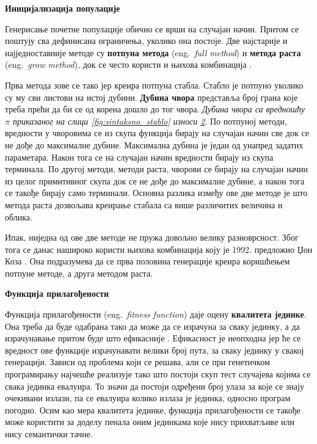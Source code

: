 \documentclass[a4paper]{article}
\begin{document}
\medskip
\noindent
\textbf{\large Иницијализација популације}\newline

Генерисање почетне популације обично се врши на случајан начин. Притом се поштују сва дефинисана ограничења, уколико она постоје. Две најстарије и најједноставније методе су \textbf{потпуна метода} (eng.~{\em full method}) и \textbf{метода раста} (eng.~{\em grow method}), док се често користи и њихова комбинација \cite{fieldGuidetoGP}.

Прва метода зове се тако јер креира потпуна стабла. Стабло је потпуно уколико су му сви листови на истој дубини. \textbf{Дубина чвора} представља број грана које треба прећи да би се од корена дошло до тог чвора. \emph{Дубина чвора са вредношћу $\pi$ приказаног на слици \ref{fig:sintaksno_stablo} износи \underline{2}}. По потпуној методи, вредности у чворовима се из скупа функција бирају на случајан начин све док се не дође до максималне дубине. Максимална дубина је један од унапред задатих параметара. Након тога се на случајан начин вредности бирају из скупа терминала. По другој методи, методи раста, чворови се бирају на случајан начин из целог примитивног скупа док се не дође до максималне дубине, а након тога се такође бирају само терминали. Основна разлика између ове две методе је што метода раста дозвољава креирање стабала са више различитих величина и облика.

Ипак, ниједна од ове две методе не пружа довољно велику разноврсност. Због тога се данас нашироко користи њихова комбинација коју је 1992. предложио Џон Коза \cite{koza}. Она подразумева да се прва половина генерације креира коришћењем потпуне методе, а друга методом раста.\newline

\medskip
\noindent
\textbf{\large Функција прилагођености}\newline 

Функција прилагођености (eng.~{\em fitness function}) даје оцену \textbf{квалитета јединке}. Она треба да буде одабрана тако да може да се израчуна за сваку јединку, а да израчунавање притом буде што ефикасније \cite{vi}. Ефикасност је неопходна јер ће се вредност ове функције израчунавати велики број пута, за сваку јединку у свакој генерацији. Зависи од проблема који се решава, али се при генетичком програмирању најчешће реализује тако што постоји скуп тест случајева којима се свака јединка евалуира. То значи да постоји одређени број улаза за које се знају очекивани излази, па се евалуира колико излаза је јединка, односно програм погодио.
Осим као мера квалитета јединке, функција прилагођености се такође може користити за доделу пенала оним јединкама које нису прихватљиве или нису семантички тачне.\newline
\end{document}
